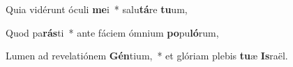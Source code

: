 \item Quia vidérunt óculi \textbf{me}i~* salu\textbf{tá}re \textbf{tu}um,
\item Quod pa\textbf{rás}ti~* ante fáciem ómnium \textbf{po}pu\textbf{ló}rum,
\item Lumen ad revelatiónem \textbf{Gén}tium,~* et glóriam plebis \textbf{tu}æ \textbf{Is}raël.
